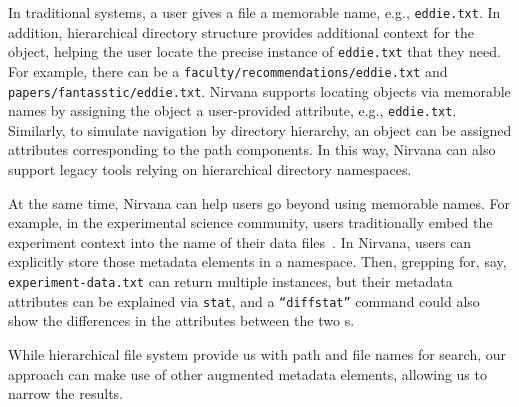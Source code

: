 
In traditional systems, a user gives a file a memorable name, e.g., \texttt{eddie.txt}.
In addition, hierarchical directory structure provides additional context for the object, helping the user locate the precise instance of \texttt{eddie.txt} that they need.
For example, there can be a \texttt{faculty/recommendations/eddie.txt} and \texttt{papers/fantasstic/eddie.txt}.
Nirvana supports locating objects via memorable names by assigning the object a user-provided attribute, e.g., \texttt{eddie.txt}.
Similarly, to simulate navigation by directory hierarchy, an object can be assigned attributes corresponding to the path components.
In this way, Nirvana can also support legacy tools relying on hierarchical directory namespaces.

At the same time, Nirvana can help users go beyond using memorable names.
For example, in the experimental science community, users traditionally embed the experiment context into the name of their data files~\cite{guo2012burrito}.
In Nirvana, users can explicitly store those metadata elements in a namespace.
Then, grepping for, say, \texttt{experiment-data.txt} can return multiple instances, but their metadata attributes can be explained via \texttt{stat}, and a \texttt{``diffstat''} command could also show the differences in the attributes between the two {\REF}s.

While hierarchical file system provide us with path and file names for search, our approach can make use of other augmented metadata elements, allowing us to narrow the results.



